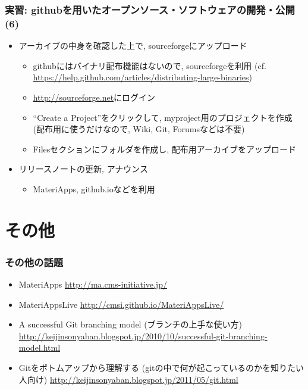 \begin{frame}[t,fragile]
  \frametitle{実習: githubを用いたオープンソース・ソフトウェアの開発・公開(6)}
  \begin{itemize}
    \setlength{\itemsep}{1em}
  \item アーカイブの中身を確認した上で, sourceforgeにアップロード
    \begin{itemize}
    \item githubにはバイナリ配布機能はないので, sourceforgeを利用 (cf. \url{https://help.github.com/articles/distributing-large-binaries})
    \item \url{http://sourceforge.net}にログイン
    \item ``Create a Project''をクリックして, myproject用のプロジェクトを作成 (配布用に使うだけなので, Wiki, Git, Forumsなどは不要)
    \item Filesセクションにフォルダを作成し, 配布用アーカイブをアップロード
    \end{itemize}
  \item リリースノートの更新, アナウンス
    \begin{itemize}
    \item MateriApps, github.ioなどを利用
    \end{itemize}
  \end{itemize}
\end{frame}

\section{その他}

\begin{frame}
  \frametitle{その他の話題}
  \begin{itemize}
    \setlength{\itemsep}{1em}
  \item MateriApps \url{http://ma.cms-initiative.jp/}
  \item MateriAppsLive \url{http://cmsi.github.io/MateriAppsLive/}

  \item A successful Git branching model (ブランチの上手な使い方) \url{http://keijinsonyaban.blogspot.jp/2010/10/successful-git-branching-model.html}
  \item Gitをボトムアップから理解する (gitの中で何が起こっているのかを知りたい人向け) 
    \url{http://keijinsonyaban.blogspot.jp/2011/05/git.html}
  \end{itemize}
\end{frame}


